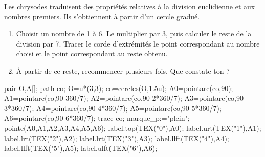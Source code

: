 \begin{exercice*}
   Les chrysodes traduisent des propriétés relatives à la division euclidienne et aux nombres premiers. Ils s'obtiennent à partir d'un cercle gradué.

   \begin{minipage}{0.7\linewidth}
      \begin{enumerate}
         \item Choisir un nombre de 1 à 6. Le multiplier par 3, puis calculer le reste de la division par 7. Tracer le corde d'extrémités le point correspondant au nombre choisi et le point correspondant au reste obtenu.
         \item À partir de ce reste, recommencer plusieurs fois. Que constate-ton ?
      \end{enumerate}  
   \end{minipage}
   \begin{minipage}{0.5\linewidth}
      \begin{center}
         \begin{Geometrie}
            pair O,A[];
            path co;
            O=u*(3,3);
            co=cercles(O,1.5u);
            A0=pointarc(co,90);
            A1=pointarc(co,90-360/7);
            A2=pointarc(co,90-2*360/7);
            A3=pointarc(co,90-3*360/7);
            A4=pointarc(co,90-4*360/7);
            A5=pointarc(co,90-5*360/7);
            A6=pointarc(co,90-6*360/7);
            trace co;
            marque_p:="plein";
            pointe(A0,A1,A2,A3,A4,A5,A6);
            label.top(TEX("0"),A0);
            label.urt(TEX("1"),A1);
            label.lrt(TEX("2"),A2);
            label.lrt(TEX("3"),A3);
            label.llft(TEX("4"),A4);
            label.llft(TEX("5"),A5);
            label.ulft(TEX("6"),A6);
         \end{Geometrie}
      \end{center}
   \end{minipage}
\end{exercice*}
